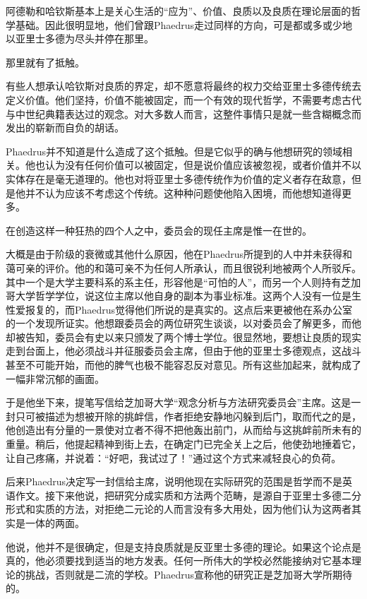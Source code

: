 \documentclass[UTF8]{article}
\begin{document}
\par 阿德勒和哈钦斯基本上是关心生活的“应为”、价值、良质以及良质在理论层面的哲学基础。因此很明显地，他们曾跟Phaedrus走过同样的方向，可是都或多或少地以亚里士多德为尽头并停在那里。
\par 那里就有了抵触。
\par 有些人想承认哈钦斯对良质的界定，却不愿意将最终的权力交给亚里士多德传统去定义价值。他们坚持，价值不能被固定，而一个有效的现代哲学，不需要考虑古代与中世纪典籍表达过的观念。对大多数人而言，这整件事情只是就一些含糊概念而发出的崭新而自负的胡话。
\par Phaedrus并不知道是什么造成了这个抵触。但是它似乎的确与他想研究的领域相关。他也认为没有任何价值可以被固定，但是说价值应该被忽视，或者价值并不以实体存在是毫无道理的。他也对将亚里士多德传统作为价值的定义者存在敌意，但是他并不认为应该不考虑这个传统。这种种问题使他陷入困境，而他想知道得更多。
\par 在创造这样一种狂热的四个人之中，委员会的现任主席是惟一在世的。
\par 大概是由于阶级的衰微或其他什么原因，他在Phaedrus所提到的人中并未获得和蔼可亲的评价。他的和蔼可亲不为任何人所承认，而且很锐利地被两个人所驳斥。其中一个是大学主要科系的系主任，形容他是“可怕的人”，而另一个人则持有芝加哥大学哲学学位，说这位主席以他自身的副本为事业标准。这两个人没有一位是生性爱报复的，而Phaedrus觉得他们所说的是真实的。这点后来更被他在系办公室的一个发现所证实。他想跟委员会的两位研究生谈谈，以对委员会了解更多，而他却被告知，委员会有史以来只颁发了两个博士学位。很显然地，要想让良质的现实走到台面上，他必须战斗并征服委员会主席，但由于他的亚里士多德观点，这战斗甚至不可能开始，而他的脾气也极不能容忍反对意见。所有这些加起来，就构成了一幅非常沉郁的画面。
\par 于是他坐下来，提笔写信给芝加哥大学“观念分析与方法研究委员会”主席。这是一封只可被描述为想被开除的挑衅信，作者拒绝安静地闪躲到后门，取而代之的是，他创造出有分量的一景使对立者不得不把他轰出前门，从而给与这挑衅前所未有的重量。稍后，他提起精神到街上去，在确定门已完全关上之后，他使劲地捶着它，让自己疼痛，并说着：“好吧，我试过了！”通过这个方式来减轻良心的负荷。
\par 后来Phaedrus决定写一封信给主席，说明他现在实际研究的范围是哲学而不是英语作文。接下来他说，把研究分成实质和方法两个范畴，是源自于亚里士多德二分形式和实质的方法，对拒绝二元论的人而言没有多大用处，因为他们认为这两者其实是一体的两面。
\par 他说，他并不是很确定，但是支持良质就是反亚里士多德的理论。如果这个论点是真的，他必须要找到适当的地方发表。任何一所伟大的学校必然能接纳对它基本理论的挑战，否则就是二流的学校。Phaedrus宣称他的研究正是芝加哥大学所期待的。
\end{document}
